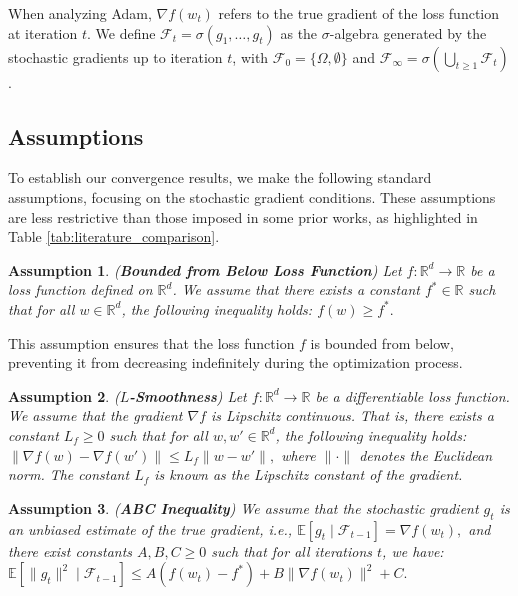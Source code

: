\documentclass{article} %
\newtheorem{assumpt}{Assumption}[section]
\begin{document}
When analyzing Adam, \( \nabla f(w_t) \) refers to the true gradient of the loss function at iteration \( t \). We define \( \mathscr{F}_t = \sigma(g_1, \dots, g_t) \) as the \( \sigma \)-algebra generated by the stochastic gradients up to iteration \( t \), with \( \mathscr{F}_0 = \{\Omega, \emptyset\} \) and \( \mathscr{F}_{\infty} = \sigma\left( \bigcup_{t \geq 1} \mathscr{F}_t \right) \).

\subsection{Assumptions}

To establish our convergence results, we make the following standard assumptions, focusing on the stochastic gradient conditions. These assumptions are less restrictive than those imposed in some prior works, as highlighted in Table \ref{tab:literature_comparison}.

\begin{assumpt}\label{ass_1}
(\textbf{Bounded from Below Loss Function}) Let \( f: \mathbb{R}^{d} \to \mathbb{R} \) be a loss function defined on \( \mathbb{R}^{d} \). We assume that there exists a constant \( f^{*} \in \mathbb{R} \) such that for all \( w \in \mathbb{R}^{d} \), the following inequality holds:
\(
f(w) \geq f^{*}.
\)
\end{assumpt}

This assumption ensures that the loss function \( f \) is bounded from below, preventing it from decreasing indefinitely during the optimization process.

\begin{assumpt}\label{ass_2}
(\textbf{\( L \)-Smoothness}) Let \( f: \mathbb{R}^{d} \to \mathbb{R} \) be a differentiable loss function. We assume that the gradient \(\nabla f \) is Lipschitz continuous. That is, there exists a constant \( L_f \geq 0 \) such that for all \( w, w' \in \mathbb{R}^{d} \), the following inequality holds:
\(
\|\nabla f(w) - \nabla f(w')\| \leq L_f \|w - w'\|,
\)
where \(\|\cdot\|\) denotes the Euclidean norm. The constant \( L_f \) is known as the Lipschitz constant of the gradient.
\end{assumpt}

\begin{assumpt}\label{ass_3}
(\textbf{ABC Inequality}) We assume that the stochastic gradient \( g_t \) is an unbiased estimate of the true gradient, i.e., $\mathbb{E}[g_{t} \mid \mathscr{F}_{t-1}] = \nabla f(w_{t}),$ and there exist constants \( A, B, C \geq 0 \) such that for all iterations \( t \), we have:
\(
\mathbb{E}[\|g_{t} \|^2 \mid \mathscr{F}_{t-1}] \leq A (f(w_t) - f^*) + B \|\nabla f(w_t)\|^{2} + C.
\)
\end{assumpt}
\end{document}
